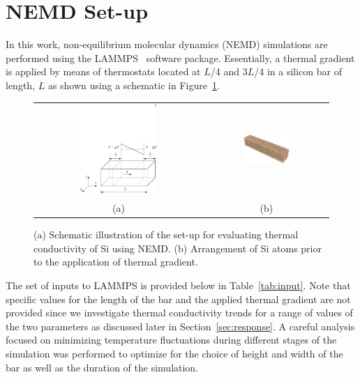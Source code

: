 \section{NEMD Set-up}
\label{sec:setup}

In this work, non-equilibrium molecular dynamics (NEMD) simulations are performed using the 
LAMMPS~\cite{Plimpton:2007} software package.
Essentially, a thermal gradient is applied by means of thermostats located at $L$/4 and $3L$/4 in a silicon bar of length, $L$ 
as shown using a schematic in Figure~\ref{fig:setup}. 

\begin{figure}[htbp]
\begin{center}
\begin{tabular}{cc}
  \includegraphics[width=0.48\textwidth]{./Figures/schematic}
  &
  \hspace{3mm}
  \includegraphics[width=0.40\textwidth]{./Figures/Sibar_05}
  \\ (a) & (b)
  \end{tabular}
\caption{(a) Schematic illustration of the set-up for evaluating thermal conductivity of Si using NEMD. (b) 
Arrangement of Si atoms prior to the application of thermal gradient.}
\label{fig:setup}
\end{center}
\end{figure}

The set of
inputs to LAMMPS is provided below in Table~\ref{tab:input}. Note that specific values for the length of the bar
and the applied thermal gradient are not provided since we investigate thermal conductivity trends for a range of 
values of the two parameters as discussed later in Section~\ref{sec:response}. A careful analysis focused on
minimizing temperature fluctuations during different stages of the simulation was performed to optimize for the
choice of height and width of the bar as well as the duration of the simulation. 

